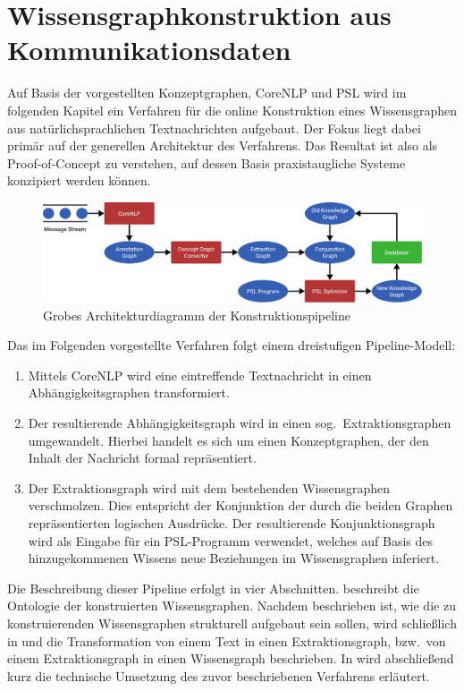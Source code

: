 \def\cgScale{0.6}

\chapter{Wissensgraph\-konstruktion aus Kommunikations\-daten}%
\label{sec:text2kg}

Auf Basis der vorgestellten Konzeptgraphen, CoreNLP und PSL wird im folgenden Kapitel ein Verfahren für die online Konstruktion eines Wissensgraphen aus natürlichsprachlichen Textnachrichten aufgebaut.
Der Fokus liegt dabei primär auf der generellen Architektur des Verfahrens.
Das Resultat ist also als Proof-of-Concept zu verstehen, auf dessen Basis praxistaugliche Systeme konzipiert werden können.

\begin{figure}[h]
	\includegraphics[width=\textwidth]{gfx/text2kg/architecture.pdf}
	\caption{Grobes Architekturdiagramm der Konstruktionspipeline}\label{fig:text2kg:architecture}
\end{figure}
Das im Folgenden vorgestellte Verfahren folgt einem dreistufigen Pipeline-Modell:
\begin{enumerate}
	\item Mittels CoreNLP wird eine eintreffende Textnachricht in einen Abhängigkeitsgraphen transformiert.
	\item Der resultierende Abhängigkeitsgraph wird in einen sog.\ Extraktionsgraphen umgewandelt.
		Hierbei handelt es sich um einen Konzeptgraphen, der den Inhalt der Nachricht formal repräsentiert.
	\item Der Extraktionsgraph wird mit dem bestehenden Wissensgraphen verschmolzen.
		Dies entspricht der Konjunktion der durch die beiden Graphen repräsentierten logischen Ausdrücke.
		Der resultierende Konjunktionsgraph wird als Eingabe für ein PSL-Programm verwendet, welches auf Basis des hinzugekommenen Wissens neue Beziehungen im Wissensgraphen inferiert.
\end{enumerate}
Die Beschreibung dieser Pipeline erfolgt in vier Abschnitten.
 beschreibt die Ontologie der konstruierten Wissensgraphen.
Nachdem beschrieben ist, wie die zu konstruierenden Wissensgraphen strukturell aufgebaut sein sollen, wird schließlich in  und  die Transformation von einem Text in einen Extraktionsgraph, bzw.\ von einem Extraktionsgraph in einen Wissensgraph beschrieben.
In  wird abschließend kurz die technische Umsetzung des zuvor beschriebenen Verfahrens erläutert.

